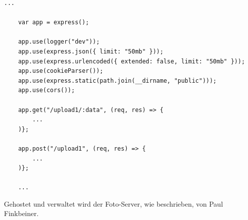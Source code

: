 \begin{lstlisting}[label=lst:expressFotoServer, caption={Codeausschnitt aus dem Foto-Server}, captionpos=b]
    ...

    var app = express();

    app.use(logger("dev"));
    app.use(express.json({ limit: "50mb" }));
    app.use(express.urlencoded({ extended: false, limit: "50mb" }));
    app.use(cookieParser());
    app.use(express.static(path.join(__dirname, "public")));
    app.use(cors());

    app.get("/upload1/:data", (req, res) => {
        ...
    )};

    app.post("/upload1", (req, res) => {
        ...
    )};

    ...
\end{lstlisting}

Gehostet und verwaltet wird der Foto-Server, wie beschrieben, von Paul Finkbeiner. 
